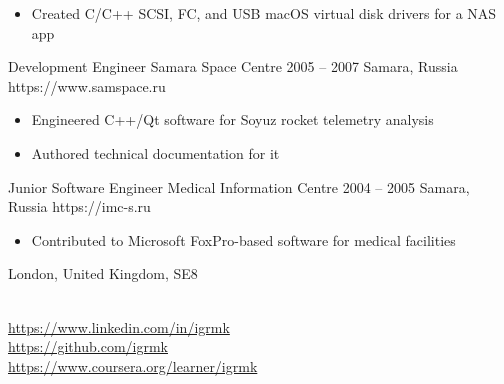 \begin{paracol}{2}
        \begin{itemize}
            \item Created C/C++ SCSI, FC, and USB macOS virtual disk drivers for a NAS app
        \end{itemize}

    \cvLeftEvent%
        {Development Engineer}
        {Samara Space Centre}
        {2005 -- 2007}
        {Samara, Russia}
        {https://www.samspace.ru}

        \begin{itemize}
            \item Engineered C++/Qt software for Soyuz rocket telemetry analysis
            \item Authored technical documentation for it
        \end{itemize}

    \cvLeftEvent%
        {Junior Software Engineer}
        {Medical Information Centre}
        {2004 -- 2005}
        {Samara, Russia}
        {https://imc-s.ru}

        \begin{itemize}
            \item Contributed to Microsoft FoxPro-based software for medical facilities
        \end{itemize}

\newpage
\switchcolumn%
\raggedright%

    London, United Kingdom, SE8\\
    \myphone\\
    \myemail%

    \vspace{6pt}
    {
        \small
        \href{https://www.linkedin.com/in/igrmk}{https://www.linkedin.com/in/igrmk}\\
        \href{https://github.com/igrmk}{https://github.com/igrmk}\\
        \href{https://www.coursera.org/learner/igrmk}{https://www.coursera.org/learner/igrmk}
        \par
    }



\end{paracol}
